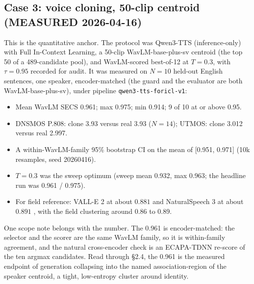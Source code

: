 \documentclass[10pt,twocolumn]{article}
\begin{document}
\subsection{Case 3: voice cloning, 50-clip centroid (MEASURED 2026-04-16)}
This is the quantitative anchor. The protocol was Qwen3-TTS (inference-only) with
Full In-Context Learning, a 50-clip WavLM-base-plus-sv centroid (the top 50 of a
489-candidate pool), and WavLM-scored best-of-12 at $T=0.3$, with $\tau=0.95$
recorded for audit. It was measured on $N=10$ held-out English sentences, one
speaker, encoder-matched (the guard and the evaluator are both
WavLM-base-plus-sv), under pipeline \texttt{qwen3-tts-foricl-v1}:
\begin{itemize}\itemsep0.1em
\item Mean WavLM SECS 0.961; max 0.975; min 0.914; 9 of 10 at or above 0.95.
\item DNSMOS P.808: clone 3.93 versus real 3.93 ($N=14$); UTMOS: clone 3.012
versus real 2.997.
\item A within-WavLM-family 95\% bootstrap CI on the mean of [0.951, 0.971] (10k
resamples, seed 20260416).
\item $T=0.3$ was the sweep optimum (sweep mean 0.932, max 0.963; the headline run
was 0.961 / 0.975).
\item For field reference: VALL-E 2 at about $0.881$ \citep{chen2024valle2} and
NaturalSpeech 3 at about $0.891$ \citep{ju2024naturalspeech3}, with the field
clustering around 0.86 to 0.89.
\end{itemize}
One scope note belongs with the number. The 0.961 is encoder-matched: the selector
and the scorer are the same WavLM family, so it is within-family agreement, and the
natural cross-encoder check is an ECAPA-TDNN \citep{desplanques2020ecapa} re-score
of the ten argmax candidates. Read through \S2.4, the 0.961 is the measured
endpoint of generation collapsing into the named association-region of the speaker
centroid, a tight, low-entropy cluster around identity.
\end{document}
